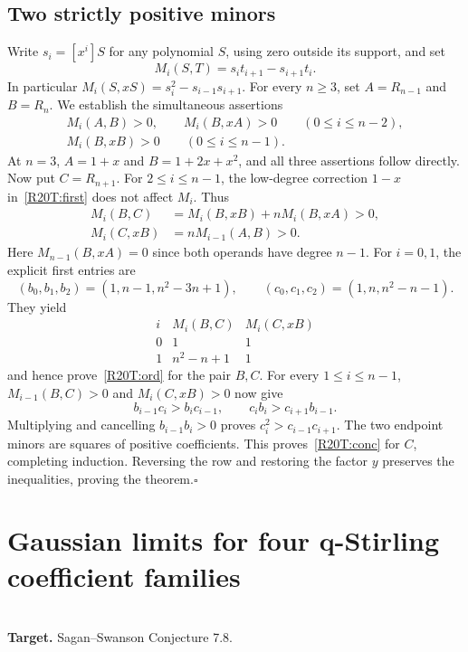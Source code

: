 \documentclass[11pt,a4paper]{article}
\begin{document}
\subsection{Two strictly positive minors}
Write $s_i=[x^i]S$ for any polynomial $S$, using zero outside its support, and set
\[
 M_i(S,T)=s_i t_{i+1}-s_{i+1}t_i.
\]
In particular $M_i(S,xS)=s_i^2-s_{i-1}s_{i+1}$. For every $n\ge3$, set $A=R_{n-1}$ and $B=R_n$. We establish the simultaneous assertions
\begin{align}
 M_i(A,B)>0,\qquad M_i(B,xA)>0\qquad (0\le i\le n-2),\label{R20T:ord}\\
 M_i(B,xB)>0\qquad(0\le i\le n-1).\label{R20T:conc}
\end{align}
At $n=3$, $A=1+x$ and $B=1+2x+x^2$, and all three assertions follow directly. Now put $C=R_{n+1}$. For $2\le i\le n-1$, the low-degree correction $1-x$ in~\eqref{R20T:first} does not affect $M_i$. Thus
\begin{align*}
 M_i(B,C)&=M_i(B,xB)+n M_i(B,xA)>0,\\
 M_i(C,xB)&=n M_{i-1}(A,B)>0 .
\end{align*}
Here $M_{n-1}(B,xA)=0$ since both operands have degree $n-1$. For $i=0,1$, the explicit first entries are
\[
 (b_0,b_1,b_2)=(1,n-1,n^2-3n+1),\qquad
 (c_0,c_1,c_2)=(1,n,n^2-n-1).
\]
They yield
\[
\begin{array}{c|cc}
 i & M_i(B,C)&M_i(C,xB)\\ \hline
 0 &1&1\\
 1 &n^2-n+1&1
\end{array}
\]
and hence prove~\eqref{R20T:ord} for the pair $B,C$.
For every $1\le i\le n-1$, $M_{i-1}(B,C)>0$ and $M_i(C,xB)>0$ now give
\[
 b_{i-1}c_i>b_ic_{i-1},\qquad c_ib_i>c_{i+1}b_{i-1}.
\]
Multiplying and cancelling $b_{i-1}b_i>0$ proves $c_i^2>c_{i-1}c_{i+1}$. The two endpoint minors are squares of positive coefficients. This proves~\eqref{R20T:conc} for $C$, completing induction. Reversing the row and restoring the factor $y$ preserves the inequalities, proving the theorem.\hfill$\square$
\endgroup


\clearpage

\section{Gaussian limits for four q-Stirling coefficient families}
\label{section:R20H}
\\[3pt]
\noindent\textbf{Target.} Sagan--Swanson Conjecture 7.8.
\end{document}
